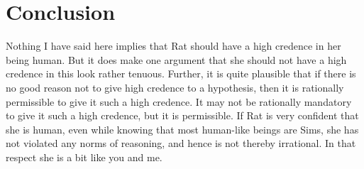 \section{Conclusion}

Nothing I have said here implies that Rat should have a high credence in her being human. But it does make one argument that she should not have a high credence in this look rather tenuous. Further, it is quite plausible that if there is no good reason not to give high credence to a hypothesis, then it is rationally permissible to give it such a high credence. It may not be rationally mandatory to give it such a high credence, but it is permissible. If Rat is very confident that she is human, even while knowing that most human-like beings are Sims, she has not violated any norms of reasoning, and hence is not thereby irrational. In that respect she is a bit like you and me. 

%
%
%
%
%
%
%
%
%
%
%
